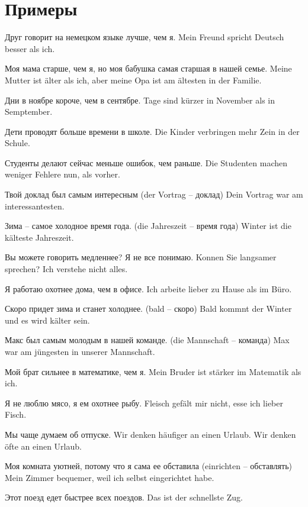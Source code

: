 \section{Примеры}

Друг говорит на немецком языке лучше, чем я. 
Mein Freund spricht Deutsch besser als ich.

Моя мама старше, чем я, но моя бабушка самая старшая в нашей семье.
Meine Mutter ist älter als ich, aber meine Opa ist am ältesten in der Familie.

Дни в ноябре короче, чем в сентябре. 
Tage sind kürzer in November als in Semptember.

Дети проводят больше времени в школе. 
Die Kinder verbringen mehr Zein in der Schule.

Студенты делают сейчас меньше ошибок, чем раньше. 
Die Studenten machen weniger Fehlere nun, als vorher. 

Твой доклад был самым интересным (der Vortrag – доклад)
Dein Vortrag war am interessantesten.

Зима – самое холодное время года. (die Jahreszeit – время года)
Winter ist die kälteste Jahreszeit.

Вы можете говорить медленнее? Я не все понимаю.
Konnen Sie langsamer sprechen? Ich verstehe nicht alles.

Я работаю охотнее дома, чем в офисе.
Ich arbeite lieber zu Hause als im Büro.

Скоро придет зима и станет холоднее. (bald – скоро)
Bald kommnt der Winter und es wird kälter sein.

Макс был самым молодым в нашей команде. (die Mannschaft – команда)
Max war am jüngesten in unserer Mannschaft.

Мой брат сильнее в математике, чем я.
Mein Bruder ist stärker im Matematik als ich.

Я не люблю мясо, я ем охотнее рыбу.
Fleisch gefält mir nicht, esse ich lieber Fisch.

Мы чаще думаем об отпуске. 
Wir denken häufiger an einen Urlaub.
Wir denken öfte an einen Urlaub.

Моя комната уютней, потому что я сама ее обставила (einrichten – обставлять)
Mein Zimmer bequemer, weil ich selbst eingerichtet habe.

Этот поезд едет быстрее всех поездов.
Das ist der schnellste Zug.

